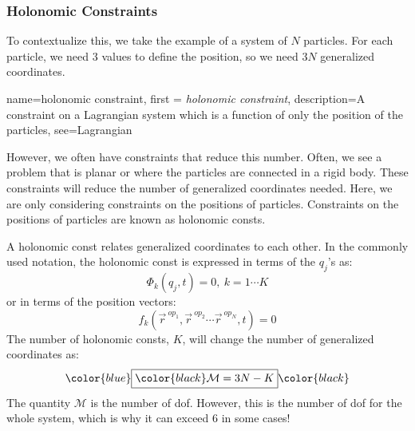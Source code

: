 \subsubsection{Holonomic Constraints}

To contextualize this, we take the example of a system of $N$ particles. For each particle, we need 3 values to define the position, so we need $3N$ generalized coordinates. 

{
    name=holonomic constraint,
    first = {\textit{holonomic constraint}},
    description={A constraint on a Lagrangian system which is a function of only the position of the particles},
    see={Lagrangian}
}

However, we often have constraints that reduce this number. Often, we see a problem that is planar or where the particles are connected in a \gls{rigid body}. These constraints will reduce the number of generalized coordinates needed. Here, we are only considering constraints on the positions of particles. Constraints on the positions of particles are known as \glspl{holonomic const}. 

A \gls{holonomic const} relates generalized coordinates to each other. In the commonly used notation, the \gls{holonomic const} is expressed in terms of the $q_j$'s as:
$$\Phi_k\left(q_j,t\right)=0, \ k=1\cdots K$$
or in terms of the position vectors:
$$f_k\left(\vec{r}^{\ op_1},\vec{r}^{\ op_2}\cdots \vec{r}^{\ op_N},t\right)=0$$
The number of \glspl{holonomic const}, $K$, will change the number of generalized coordinates as:
\begin{gather}\label{eq:dof}
\color{blue}\boxed{\color{black}\mathcal{M}=3N-K}\color{black}
\end{gather}
The quantity $\mathcal{M}$ is the number of \gls{dof}. However, this is the number of \gls{dof} for the whole system, which is why it can exceed 6 in some cases!

